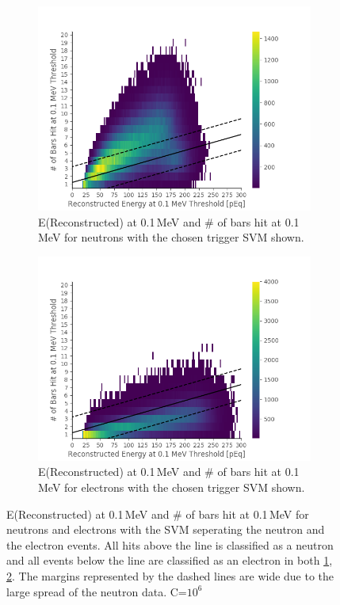 \documentclass[12pt,a4paper]{article}
\begin{document}
\begin{figure}[H]
\centering
\begin{subfigure}{.5\textwidth}
  \centering
  \includegraphics[width=\linewidth]{chosen_svm_neutron.png}
  \captionsetup{width=.9\linewidth}
  \caption{E(Reconstructed) at 0.1\,MeV and \# of bars hit at 0.1\,MeV for neutrons with the chosen trigger SVM shown.}
  \label{svm_neutron}
\end{subfigure}%
\begin{subfigure}{.5\textwidth}
  \centering
  \includegraphics[width=\linewidth]{chosen_svm_electron.png}
  \captionsetup{width=.9\linewidth}
  \caption{E(Reconstructed) at 0.1\,MeV and \# of bars hit at 0.1\,MeV for electrons with the chosen trigger SVM shown.}
  \label{svm_electron}
\end{subfigure}
\caption{E(Reconstructed) at 0.1\,MeV and \# of bars hit at 0.1\,MeV for neutrons and electrons with the SVM seperating the neutron and the electron events. All hits above the line is classified as a neutron and all events below the line are classified as an electron in both \ref{svm_neutron}, \ref{svm_electron}. The margins represented by the dashed lines are wide due to the large spread of the neutron data. C=$10^6$}
\label{svm_on_neutrons_and_electrons}
\end{figure}
\end{document}
